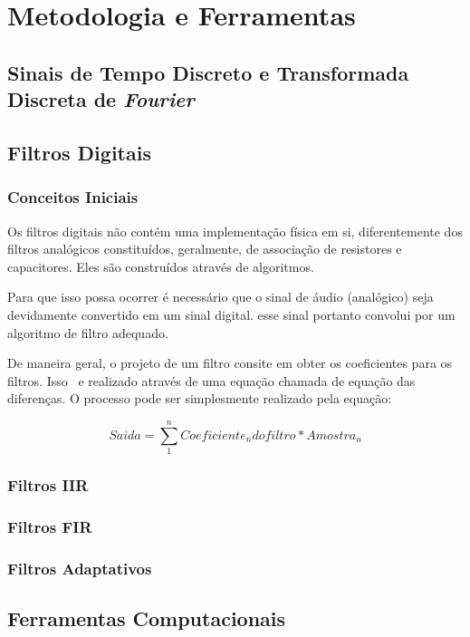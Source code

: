 \chapter{Metodologia e Ferramentas}


\section{Sinais de Tempo Discreto e Transformada Discreta de \textit{Fourier}}

\section{Filtros Digitais}

	\subsection{Conceitos Iniciais}
	
	Os filtros digitais não contém uma implementação física em si, diferentemente dos filtros analógicos constituídos, geralmente, de associação de resistores e capacitores. Eles são construídos através de algoritmos.
	
	Para que isso possa ocorrer é necessário que o sinal de áudio (analógico) seja devidamente convertido em um sinal digital. esse sinal portanto convolui por um algoritmo de filtro adequado.
	
	De maneira geral, o projeto de um filtro consite em obter os coeficientes para os filtros. Isso ~e realizado através de uma equação chamada de equação das diferenças. O processo pode ser simplesmente realizado pela equação:
	
	\begin{equation}
		Saida = \sum_{1}^{n} Coeficiente_n do filtro * Amostra_n
	\end{equation}
	
	
	\subsection{Filtros IIR}
	\subsection{Filtros FIR}
	\subsection{Filtros Adaptativos}

\section{Ferramentas Computacionais}